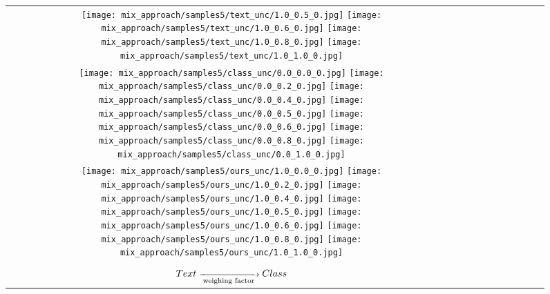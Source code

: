 \documentclass[10pt,twocolumn,letterpaper]{article}
\begin{document}
\begin{figure}[tb!]
{\begin{tabular}{c c c c c c c c c c  }
\texttt{[image: mix\_approach/samples5/text\_unc/1.0\_0.5\_0.jpg]}
\texttt{[image: mix\_approach/samples5/text\_unc/1.0\_0.6\_0.jpg]}
\texttt{[image: mix\_approach/samples5/text\_unc/1.0\_0.8\_0.jpg]}
\texttt{[image: mix\_approach/samples5/text\_unc/1.0\_1.0\_0.jpg]}
\tabularnewline
    \raisebox{0.1in}{\rotatebox{90}{\small \emph{Class}
 }}
 \texttt{[image: mix\_approach/samples5/class\_unc/0.0\_0.0\_0.jpg]}
\texttt{[image: mix\_approach/samples5/class\_unc/0.0\_0.2\_0.jpg]}
\texttt{[image: mix\_approach/samples5/class\_unc/0.0\_0.4\_0.jpg]}
\texttt{[image: mix\_approach/samples5/class\_unc/0.0\_0.5\_0.jpg]}
\texttt{[image: mix\_approach/samples5/class\_unc/0.0\_0.6\_0.jpg]}
\texttt{[image: mix\_approach/samples5/class\_unc/0.0\_0.8\_0.jpg]}
\texttt{[image: mix\_approach/samples5/class\_unc/0.0\_1.0\_0.jpg]}
\tabularnewline
    \raisebox{0.1in}{\rotatebox{90}{\small \emph{Mix
} }}
  \texttt{[image: mix\_approach/samples5/ours\_unc/1.0\_0.0\_0.jpg]}
  \texttt{[image: mix\_approach/samples5/ours\_unc/1.0\_0.2\_0.jpg]}
  \texttt{[image: mix\_approach/samples5/ours\_unc/1.0\_0.4\_0.jpg]}
  \texttt{[image: mix\_approach/samples5/ours\_unc/1.0\_0.5\_0.jpg]}
  \texttt{[image: mix\_approach/samples5/ours\_unc/1.0\_0.6\_0.jpg]}
  \texttt{[image: mix\_approach/samples5/ours\_unc/1.0\_0.8\_0.jpg]}
  \texttt{[image: mix\_approach/samples5/ours\_unc/1.0\_1.0\_0.jpg]}

\tabularnewline



\tabularnewline
  $\scriptsize{Text}\xrightarrow[\text{weighing factor}]{\hspace*{2cm}}\scriptsize{Class}$
\vspace{2mm}
\vspace{-2\baselineskip}
\end{tabular}}
\vspace{-0.4cm}
\hspace{20pt}
\label{fig:glideablation2}
\vspace{-2mm}
\end{figure}  \begin{table}[t]
\centering


\end{table}
\end{document}
